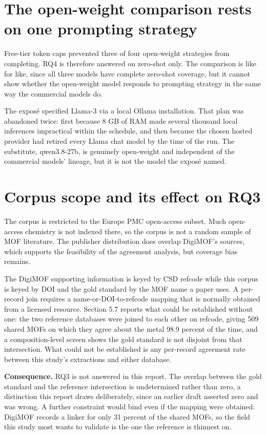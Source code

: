 \documentclass[11pt,a4paper,oneside]{report}
\begin{document}
\section{The open-weight comparison rests on one prompting strategy}

Free-tier token caps prevented three of four open-weight strategies from completing. RQ4 is therefore answered on zero-shot only. The comparison is like for like, since all three models have complete zero-shot coverage, but it cannot show whether the open-weight model responds to prompting strategy in the same way the commercial models do.

The exposé specified Llama-3 via a local Ollama installation. That plan was abandoned twice: first because 8 GB of RAM made several thousand local inferences impractical within the schedule, and then because the chosen hosted provider had retired every Llama chat model by the time of the run. The substitute, qwen3.8-27b, is genuinely open-weight and independent of the commercial models' lineage, but it is not the model the exposé named.

\section{Corpus scope and its effect on RQ3}

The corpus is restricted to the Europe PMC open-access subset. Much open-access chemistry is not indexed there, so the corpus is not a random sample of MOF literature. The publisher distribution does overlap DigiMOF's sources, which supports the feasibility of the agreement analysis, but coverage bias remains.

The DigiMOF supporting information is keyed by CSD refcode while this corpus is keyed by DOI and the gold standard by the MOF name a paper uses. A per-record join requires a name-or-DOI-to-refcode mapping that is normally obtained from a licensed resource. Section 5.7 reports what could be established without one: the two reference databases were joined to each other on refcode, giving 509 shared MOFs on which they agree about the metal 98.9 percent of the time, and a composition-level screen shows the gold standard is not disjoint from that intersection. What could not be established is any per-record agreement rate between this study's extractions and either database.

\textbf{Consequence.} RQ3 is not answered in this report. The overlap between the gold standard and the reference intersection is undetermined rather than zero, a distinction this report draws deliberately, since an earlier draft asserted zero and was wrong. A further constraint would bind even if the mapping were obtained: DigiMOF records a linker for only 31 percent of the shared MOFs, so the field this study most wants to validate is the one the reference is thinnest on.
\end{document}
